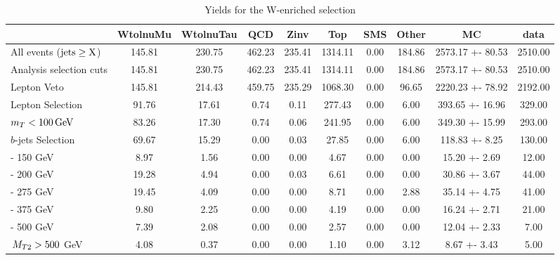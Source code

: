 \begin{table}[!htb]
\setlength{\tabcolsep}{2pt}
\small
\begin{center}

\begin{tabular}{lccccccccc} 
\hline\hline
& WtolnuMu& WtolnuTau& QCD& Zinv& Top& SMS& Other& MC& data \\ \hline \hline
 All events ($\rm jets\geq X$) & 145.81  & 230.75  & 462.23  & 235.41  & 1314.11  & 0.00 & 184.86  & 2573.17 +- 80.53 & 2510.00  \\
Analysis selection cuts& 145.81  & 230.75  & 462.23  & 235.41  & 1314.11  & 0.00 & 184.86  & 2573.17 +- 80.53 & 2510.00  \\ 
Lepton Veto & 145.81  & 214.43  & 459.75  & 235.29  & 1068.30  & 0.00 & 96.65  & 2220.23 +- 78.92 & 2192.00  \\ 
Lepton Selection & 91.76  & 17.61  & 0.74  & 0.11  & 277.43  & 0.00 & 6.00  & 393.65 +- 16.96 & 329.00  \\ 
$m_T < 100\, \rm GeV$ & 83.26  & 17.30  & 0.74  & 0.06  & 241.95  & 0.00 & 6.00  & 349.30 +- 15.99 & 293.00  \\  
$b$-jets Selection & 69.67  & 15.29  & 0.00  & 0.03  & 27.85  & 0.00 & 6.00  & 118.83 +- 8.25 & 130.00  \\ 
 \mttwo  100 - 150 GeV & 8.97  & 1.56  & 0.00  & 0.00  & 4.67  & 0.00  & 0.00  & 15.20 +- 2.69 & 12.00  \\ 
 \mttwo  150 - 200 GeV & 19.28  & 4.94  & 0.00  & 0.03  & 6.61  & 0.00 & 0.00  & 30.86 +- 3.67 & 44.00  \\
 \mttwo  200 - 275 GeV & 19.45  & 4.09  & 0.00  & 0.00  & 8.71  & 0.00 & 2.88  & 35.14 +- 4.75 & 41.00  \\ 
 \mttwo  275 - 375 GeV  & 9.80  & 2.25  & 0.00  & 0.00  & 4.19  & 0.00 & 0.00  & 16.24 +- 2.71 & 21.00  \\ 
 \mttwo  375 - 500 GeV & 7.39  & 2.08  & 0.00  & 0.00  & 2.57  & 0.00 & 0.00  & 12.04 +- 2.33 & 7.00  \\ 
 $\,{M_{T2}} > 500$ GeV & 4.08  & 0.37  & 0.00  & 0.00  & 1.10  & 0.00  & 3.12  & 8.67 +- 3.43 & 5.00  \\
\hline\hline 
\end{tabular} 
\caption{Yields for the W-enriched selection}
\label{tab:WenrichYields}
\end{center} 
\end{table}

